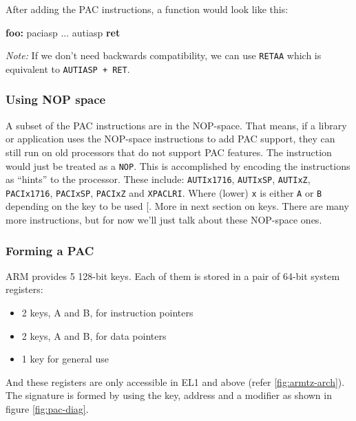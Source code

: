 \documentclass[a4paper, nobind]{templates/ociamthesis}
\providecommand{\tightlist}{%
  \setlength{\itemsep}{0pt}\setlength{\parskip}{0pt}}
\newenvironment{Shaded}{\begin{snugshade}}{\end{snugshade}}
\newcommand{\ControlFlowTok}[1]{\textcolor[rgb]{0.13,0.29,0.53}{\textbf{#1}}}
\newcommand{\FunctionTok}[1]{\textcolor[rgb]{0.13,0.29,0.53}{\textbf{#1}}}
\newcommand{\NormalTok}[1]{#1}
\renewenvironment{Shaded}
{
  \vspace{10pt}%
  \begin{snugshade}%
}{%
  \end{snugshade}%
  \vspace{8pt}%
}
\begin{document}
After adding the PAC instructions, a function would look like this:

\begin{Shaded}
\begin{Highlighting}[]
\FunctionTok{foo:}
\NormalTok{  paciasp}
\NormalTok{  ...}
\NormalTok{  autiasp}
  \ControlFlowTok{ret}
\end{Highlighting}
\end{Shaded}

\emph{Note:} If we don't need backwards compatibility, we can use \texttt{RETAA} which is equivalent to \texttt{AUTIASP\ +\ RET}.

\subsubsection{Using NOP space}\label{using-nop-space}

A subset of the PAC instructions are in the NOP-space. That means, if a
library or application uses the NOP-space instructions to add PAC support,
they can still run on old processors that do not support PAC features.
The instruction would just be treated as a \texttt{NOP}.
This is accomplished by encoding the instructions as ``hints'' to the processor.
These include: \texttt{AUTIx1716}, \texttt{AUTIxSP}, \texttt{AUTIxZ}, \texttt{PACIx1716}, \texttt{PACIxSP}, \texttt{PACIxZ} and \texttt{XPACLRI}.
Where (lower) \texttt{x} is either \texttt{A} or \texttt{B} depending on the key to be used {[}\citeproc{ref-sipearl}{51}{]}.
More in next section on keys. There are many more instructions,
but for now we'll just talk about these NOP-space ones.

\subsubsection{Forming a PAC}\label{forming-a-pac}

ARM provides 5 128-bit keys. Each of them is stored in a pair of 64-bit system registers:

\begin{itemize}
\tightlist
\item
  2 keys, A and B, for instruction pointers
\item
  2 keys, A and B, for data pointers
\item
  1 key for general use
\end{itemize}

And these registers are only accessible in EL1 and above (refer \ref{fig:armtz-arch}).
The signature is formed by using the key, address and a modifier as shown in figure \ref{fig:pac-diag}.
\end{document}
